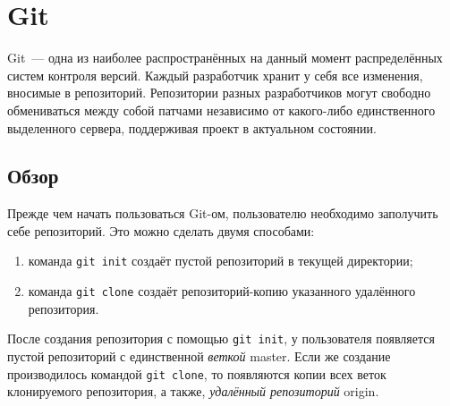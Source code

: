 \section{Git}

Git~--- одна из наиболее распространённых на данный момент
распределённых систем контроля версий. Каждый разработчик хранит у
себя все изменения, вносимые в репозиторий. Репозитории разных
разработчиков могут свободно обмениваться между собой патчами
независимо от какого-либо единственного выделенного сервера,
поддерживая проект в актуальном состоянии.

\subsection{Обзор}

Прежде чем начать пользоваться Git-ом, пользователю необходимо
заполучить себе репозиторий. Это можно сделать двумя способами:

\begin{enumerate}
\item команда \verb!git init! создаёт пустой репозиторий в текущей
  директории;
\item команда \verb!git clone! создаёт репозиторий-копию указанного
  удалённого репозитория.
\end{enumerate}

После создания репозитория с помощью \verb!git init!, у пользователя
появляется пустой репозиторий с единственной \emph{веткой} master.
Если же создание производилось командой \verb!git clone!, то
появляются копии всех веток клонируемого репозитория, а также,
\emph{удалённый репозиторий} origin.

